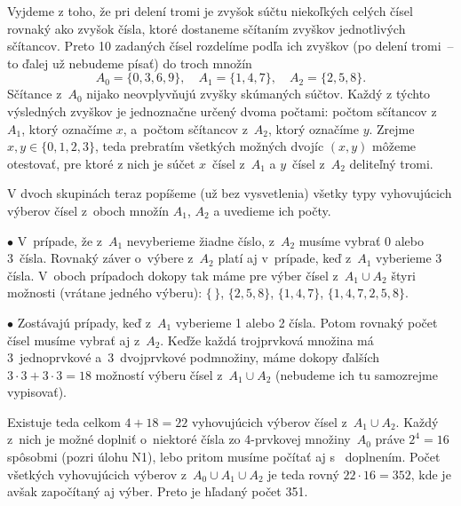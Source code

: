 {%
Vyjdeme z toho, že pri delení tromi je zvyšok súčtu niekoľkých celých čísel
rovnaký ako zvyšok čísla, ktoré dostaneme sčítaním zvyškov
jednotlivých sčítancov.
Preto 10 zadaných čísel rozdelíme podľa ich zvyškov
(po delení tromi~-- to ďalej už nebudeme písať) do troch množín
$$
A_0=\{0,3,6,9\},\quad A_1=\{1,4,7\},\quad A_2=\{2,5,8\}.
$$
Sčítance z~$A_0$ nijako neovplyvňujú zvyšky skúmaných súčtov.
Každý z týchto výsledných zvyškov je jednoznačne určený dvoma počtami:
počtom sčítancov z~$A_1$, ktorý označíme $x$,
a~počtom sčítancov z~$A_2$, ktorý označíme $y$. Zrejme
$x,y\in\{0,1,2,3\}$, teda prebratím všetkých možných dvojíc $(x,y)$
môžeme otestovať, pre ktoré z nich je súčet $x$~čísel z~$A_1$
a $y$~čísel z~$A_2$ deliteľný tromi.

V dvoch skupinách teraz popíšeme (už bez vysvetlenia)
všetky typy vyhovujúcich výberov čísel z~oboch množín $A_1$,
$A_2$ a uvedieme ich počty.

\smallskip

\item{$\bullet$}
V~prípade, že z~$A_1$ nevyberieme žiadne číslo, z~$A_2$
musíme vybrať 0 alebo 3~čísla. Rovnaký záver o~výbere
z~$A_2$ platí aj v~prípade, keď z~$A_1$ vyberieme 3 čísla.
V~oboch prípadoch dokopy tak máme pre výber čísel
z~$A_1\cup A_2$ štyri možnosti (vrátane jedného  výberu):
$\{\,\}$, $\{2,5,8\}$, $\{1,4,7\}$,
$\{1,4,7,2,5,8\}$.

\item{$\bullet$}
Zostávajú prípady, keď z~$A_1$ vyberieme 1 alebo 2 čísla. Potom rovnaký počet
čísel musíme vybrať aj z~$A_2$. Keďže každá trojprvková množina má
3~jednoprvkové a~3~dvojprvkové podmnožiny, máme dokopy ďalších
$3\cdot3+3\cdot3=18$ možností výberu čísel z~$A_1\cup A_2$
(nebudeme ich tu samozrejme vypisovať).

\smallskip\noindent
Existuje teda celkom $4+18=22$ vyhovujúcich výberov čísel
z~$A_1\cup A_2$. Každý z~nich je možné doplniť o~niektoré čísla zo 4-prvkovej
množiny~$A_0$ práve $2^4=16$ spôsobmi (pozri úlohu N1),
lebo pritom musíme počítať
aj s~ doplnením. Počet všetkých vyhovujúcich výberov
z~$A_0\cup A_1\cup A_2$ je teda rovný $22\cdot16=352$, kde je
avšak započítaný aj  výber. Preto je hľadaný počet 351.

}
